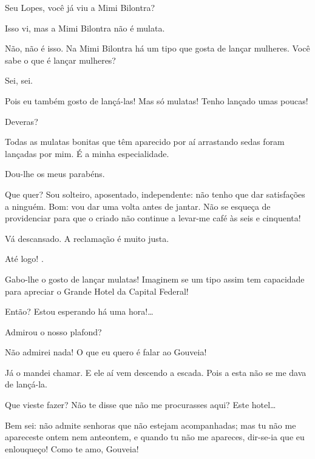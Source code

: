 Seu Lopes, você já viu a Mimi Bilontra?

 Isso vi, mas a Mimi Bilontra não é mulata.

 Não, não é isso. Na Mimi Bilontra há um tipo que gosta de
lançar mulheres. Você sabe o que é lançar mulheres?

 Sei, sei.

 Pois eu também gosto de lançá-las! Mas só mulatas! Tenho
lançado umas poucas!

 Deveras?

 Todas as mulatas bonitas que têm aparecido por aí arrastando
sedas foram lançadas por mim. É a minha especialidade.

 Dou-lhe os meus parabéns.

 Que quer? Sou solteiro, aposentado, independente: não tenho
que dar satisfações a ninguém.  Bom: vou dar uma volta antes de
jantar. Não se esqueça de providenciar para que o criado não continue a levar-me café
às seis e cinquenta!

 Vá descansado. A reclamação é muito justa.

 Até logo! .

  Gabo-lhe o gosto de lançar mulatas! Imaginem se um tipo
assim tem capacidade para apreciar o Grande Hotel da Capital Federal!


  Então? Estou esperando há uma hora!\ldots{}

 Admirou o nosso plafond?

 Não admirei nada! O que eu quero é falar ao Gouveia!

 Já o mandei chamar.  E ele
aí vem descendo a escada.  Pois a esta não se me dava de lançá-la.

  Que vieste fazer? Não te disse que não me
procurasses aqui? Este hotel\ldots{}

 Bem sei: não admite senhoras que não estejam acompanhadas; mas tu
não me apareceste ontem nem anteontem, e quando tu não me apareces, dir-se-ia
que eu enlouqueço! Como te amo, Gouveia! 

